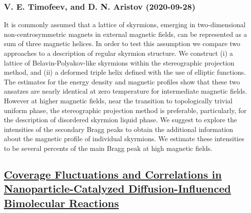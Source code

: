 \subsubsection*{V. E. Timofeev, and D. N. Aristov (2020-09-28)}
It is commonly assumed that a lattice of skyrmions, emerging in
two-dimensional non-centrosymmetric magnets in external magnetic fields, can be
represented as a sum of three magnetic helices. In order to test this
assumption we compare two approaches to a description of regular skyrmion
structure. We construct (i) a lattice of Belavin-Polyakov-like skyrmions within
the stereographic projection method, and (ii) a deformed triple helix defined
with the use of elliptic functions. The estimates for the energy density and
magnetic profiles show that these two ansatzes are nearly identical at zero
temperature for intermediate magnetic fields. However at higher magnetic
fields, near the transition to topologically trivial uniform phase, the
stereographic projection method is preferable, particularly, for the
description of disordered skyrmion liquid phase. We suggest to explore the
intensities of the secondary Bragg peaks to obtain the additional information
about the magnetic profile of individual skyrmions. We estimate these
intensities to be several percents of the main Bragg peak at high magnetic
fields.

\subsection*{\href{http://arxiv.org/abs/2009.13310v1}{Coverage Fluctuations and Correlations in Nanoparticle-Catalyzed  Diffusion-Influenced Bimolecular Reactions}}
